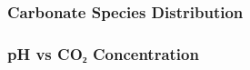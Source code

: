 
\begin{frame}
\frametitle{Carbonate Species Distribution}
\centering

\end{frame}

\begin{frame}
\frametitle{pH vs CO₂ Concentration}
\centering

\end{frame}
